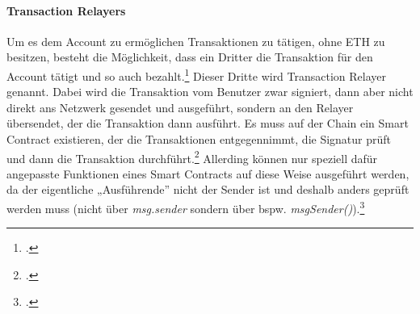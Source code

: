 \paragraph{Transaction Relayers}
\label{sec:definition-transaction-relayers}
Um es dem Account zu ermöglichen Transaktionen zu tätigen, ohne ETH zu besitzen, besteht die Möglichkeit, dass ein Dritter die Transaktion für den Account tätigt und so auch bezahlt.\footcites[Vgl. hierzu und zum Folgenden sowie weiterführend][]{w24}[]{w26}
Dieser Dritte wird Transaction Relayer genannt.
Dabei wird die Transaktion vom Benutzer zwar signiert, dann aber nicht direkt ans Netzwerk gesendet und ausgeführt, sondern an den Relayer übersendet, der die Transaktion dann ausführt.
Es muss auf der Chain ein Smart Contract existieren, der die Transaktionen entgegennimmt, die Signatur prüft und dann die Transaktion durchführt.\footcite[Vgl.][]{w25}
Allerding können nur speziell dafür angepasste Funktionen eines Smart Contracts auf diese Weise ausgeführt werden, da der eigentliche „Ausführende” nicht der Sender ist und deshalb anders geprüft werden muss (nicht über \textit{msg.sender} sondern über bspw. \textit{msgSender()}).\footcites[Vgl.][]{w27}[]{w24}